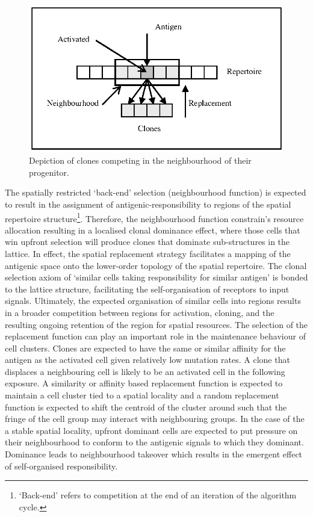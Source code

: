 \begin{figure}[ht]
	\centering
	\includegraphics[scale=0.85]{Cells/cells-spatial-process}
	\caption{Depiction of clones competing in the neighbourhood of their progenitor.}
	\label{pic:cells:spatial:clones}
\end{figure}

The spatially restricted `back-end' selection (neighbourhood function) is expected to result in the assignment of antigenic-responsibility to regions of the spatial repertoire structure\footnote{`Back-end' refers to competition at the end of an iteration of the algorithm cycle.}. Therefore, the neighbourhood function constrain's resource allocation resulting in a localised clonal dominance effect, where those cells that win upfront selection will produce clones that dominate sub-structures in the lattice. In effect, the spatial replacement strategy facilitates a mapping of the antigenic space onto the lower-order topology of the spatial repertoire. The clonal selection axiom of `similar cells taking responsibility for similar antigen' is bonded to the lattice structure, facilitating the self-organisation of receptors to input signals. Ultimately, the expected organisation of similar cells into regions results in a broader competition between regions for activation, cloning, and the resulting ongoing retention of the region for spatial resources.
The selection of the replacement function can play an important role in the maintenance behaviour of cell clusters. Clones are expected to have the same or similar affinity for the antigen as the activated cell given relatively low mutation rates. A clone that displaces a neighbouring cell is likely to be an activated cell in the following exposure. A similarity or affinity based replacement function is expected to maintain a cell cluster tied to a spatial locality and a random replacement function is expected to shift the centroid of the cluster around such that the fringe of the cell group may interact with neighbouring groups. In the case of the a stable spatial locality, upfront dominant cells are expected to put pressure on their neighbourhood to conform to the antigenic signals to which they dominant. Dominance leads to neighbourhood takeover which results in the emergent effect of self-organised responsibility. 

